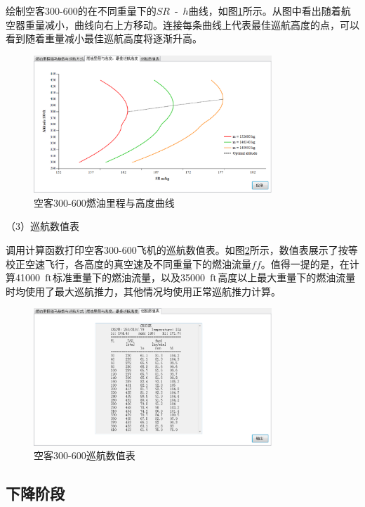 \documentclass[a4paper,punct,space,heading=true,AutoFakeBold]{ctexrep}
\begin{document}
绘制空客300-600的在不同重量下的$SR$\ -\ $h$曲线，如图\ref{optimalaltitude}所示。从图中看出随着航空器重量减小，曲线向右上方移动。连接每条曲线上代表最佳巡航高度的点，可以看到随着重量减小最佳巡航高度将逐渐升高。

\begin{figure}[h]
	\centering
	\includegraphics[width=0.8\textwidth]{pic/optimalaltitude.eps}\hspace{30pt}
	\caption{空客300-600燃油里程与高度曲线}\label{optimalaltitude}
\end{figure}


（3）巡航数值表

调用计算函数打印空客300-600飞机的巡航数值表。如图\ref{cruisetable}所示，数值表展示了按等校正空速飞行，各高度的真空速及不同重量下的燃油流量$ff$。值得一提的是，在计算41000\ $\rm ft$标准重量下的燃油流量，以及35000\ $\rm ft$高度以上最大重量下的燃油流量时均使用了最大巡航推力，其他情况均使用正常巡航推力计算。

\begin{figure}[h]
	\centering
	\includegraphics[width=0.8\textwidth]{pic/cruisetable.eps}\hspace{30pt}
	\caption{空客300-600巡航数值表}\label{cruisetable}
\end{figure}


\subsection{下降阶段}
\end{document}
